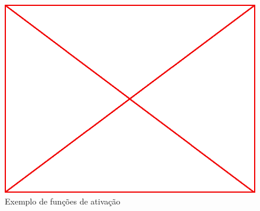 \begin{figure}\label{fig:limit-functions-exapmple}
  \caption{Exemplo de funções de ativação}
  \begin{center}
    \includegraphics[scale=0.5]{placeholder}
  \end{center}
\end{figure}

